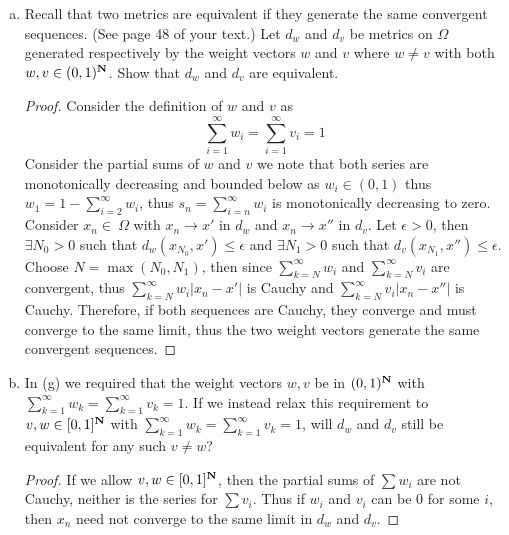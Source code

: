 \documentclass{article}
\newtheorem{proof}{Proof}
\def\le{\leqslant}
\def\to{\rightarrow}
\def\max{\operatorname{max}}
\begin{document}
\begin{enumerate}[a)]
\item Recall that two metrics are equivalent if they generate the same convergent sequences.  (See page 48 of your text.)  Let \(d_w\) and \(d_v\) be metrics on \(\Omega\) generated respectively by the weight vectors \(w\) and \(v\) where \(w \neq  v\) with 
both \(w, v \in (0,1)^{\bf N}\).  Show that \(d_w\) and \(d_v\) are equivalent.
\begin{proof}
Consider the definition of $w$ and $v$ as
\[
\sum_{i=1}^\infty w_i = \sum_{i=1}^\infty v_i = 1
\]
Consider the partial sums of $w$ and $v$ we note that both series are
monotonically decreasing and bounded below as $w_i\in(0,1)$ thus
$w_1 = 1-\sum_{i=2}^\infty w_i$, thus $s_n=\sum_{i=n}^\infty w_i$ is monotonically
decreasing to zero. Consider $x_n \in\ \Omega$ with $x_n \to x'$ in $d_w$ and
$x_n\to x''$ in $d_v$. Let $\epsilon > 0$, then $\exists N_0>0$ such that
$d_w(x_{N_0},x') \le \epsilon$ and $\exists N_1>0$ such that 
$d_v(x_{N_1},x'') \le \epsilon$. Choose $N=\max(N_0,N_1)$, then
since $\sum_{k=N}^\infty w_i$ and $\sum_{k=N}^\infty v_i$ are convergent, thus
$\sum_{k=N}^\infty w_i|x_n-x'|$ is Cauchy and 
$\sum_{k=N}^\infty v_i|x_n-x''|$ is Cauchy. Therefore, if both sequences are
Cauchy, they converge and must converge to the same limit, thus the two
weight vectors generate the same convergent sequences.


\end{proof}
\item In (g) we required that the weight vectors \(w,v\) be in \( (0,1)^{\bf N}\) 
with \( \sum_{k=1}^\infty w_k = \sum_{k=1}^\infty v_k =1\).  If we instead relax this requirement to \(v, w \in [0,1]^{\bf N}\) 
with \( \sum_{k=1}^\infty w_k = \sum_{k=1}^\infty v_k =1\), will \(d_w\) and \(d_v\) still be equivalent for any such \(v \neq w\)?
\begin{proof}
If we allow $v,w\in [0,1]^{\bf N}$, then the partial sums of $\sum w_i$ are
not Cauchy, neither is the series for $\sum v_i$. Thus if $w_i$ and $v_i$
can be 0 for some $i$, then $x_n$ need not converge to the same limit
in $d_w$ and $d_v$.
\end{proof}
\end{enumerate}
\end{document}

